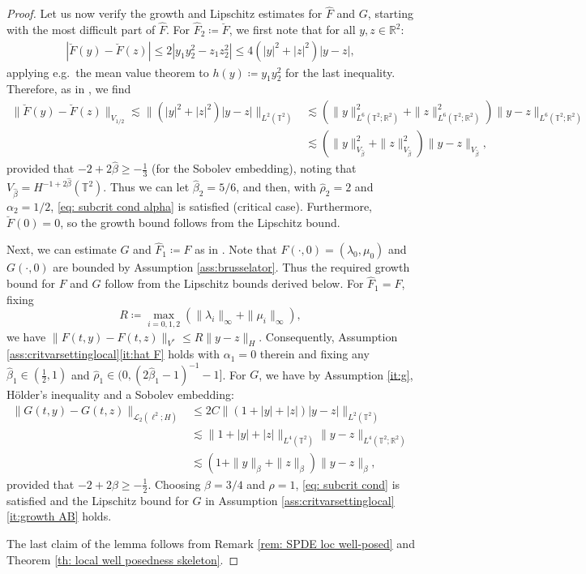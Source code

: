 \documentclass{amsart}
\newcommand{\<}{\langle}
\newcommand{\?}{\rangle}
\newcommand{\ceqq}{\coloneqq}
\newcommand{\Tor}{\mathbb{T}}
\renewcommand{\Tor}{\mathbb{T}^2}
\theoremstyle{plain}
\theoremstyle{remark}
\theoremstyle{plain}
\numberwithin{equation}{section}
\def\R{{\mathbb R}}
\begin{document}
\begin{proof}
Let us now verify the growth and Lipschitz estimates for $\hat{F}$ and $G$, starting with the most difficult part of $\hat{F}$. 
For $\hat{F}_2\ceqq \breve{F}$, we first note that for all $y,z\in\R^2$:   
\begin{align*} 
|\breve{F}(y)-\breve{F}(z)|\leq 2|y_1y_2^2-z_1z_2^2|\leq 4(|y|^2+|z|^2)|y-z|,
\end{align*}
applying e.g.\  the mean value theorem to $h(y)\ceqq y_1y_2^2$ for the last inequality.  
Therefore, as in \cite[Th.\ 8.2, p.\ 53]{BGV}, we find 
\begin{align*} 
\|\breve{F}(y)-\breve{F}(z)\|_{V_{1/2}}\lesssim\|(|y|^2+|z|^2)|y-z|\|_{L^2(\Tor)}
&\lesssim(\|y\|_{L^6(\Tor;\R^2)}^2+\|z\|_{L^6(\Tor;\R^2)}^2)\|y-z\|_{L^6(\Tor;\R^2)}\\
&\lesssim (\|y\|_{V_{\hat{\beta}}}^2+\|z\|_{V_{\hat{\beta}}}^2)\|y-z\|_{V_{\hat{\beta}}},
\end{align*}
provided that $-2+2\hat{\beta}\geq -\frac13$  (for the Sobolev embedding), noting that  $V_{\hat{\beta}}=H^{-1+2\hat{\beta}}(\Tor)$. Thus we can let $\hat{\beta}_2=5/6$, and then, with $\hat{\rho}_2=2$ and $\alpha_2=1/2$, \eqref{eq: subcrit cond alpha} is satisfied (critical case).  Furthermore, $\breve{F}(0)=0$, so the growth bound follows from the Lipschitz bound. 

Next, we can estimate $G$ and  $\hat{F}_1\ceqq F$ as in \cite[\S5.3, p.\ 993, 994]{AV22variational}. 
Note that  $F(\cdot,0)=(\lambda_0, \mu_0)$ and $G(\cdot,0)$ are bounded by Assumption \ref{ass:brusselator}. Thus the required growth bound for $F$ and $G$ follow from the Lipschitz bounds derived below.  
For $\hat{F}_1= F$, fixing 
\begin{equation}\label{eq:def R}
  {R}\ceqq \max_{i=0,1,2}(\|\lambda_i\|_\infty+\|\mu_i\|_\infty),
\end{equation} 
we have   $\|{F}(t,y)-{F}(t,z)\|_{V^*} \leq {R} \|y-z\|_{H}$.  
Consequently, Assumption \ref{ass:critvarsettinglocal}\ref{it:hat F} holds with $\alpha_1=0$ therein and fixing any $\hat{\beta}_1\in(\frac12,1)$ and $\hat{\rho}_1\in(0,({2\hat{\beta}_1-1})^{-1}-1]$.        
For $G$, we have by Assumption \ref{it:g}, H\"older's inequality and a Sobolev embedding:
\begin{align*} 
\|G(t,y)-G(t,z)\|_{\mathscr{L}_2(\ell^2;H)}&\leq 2C\|(1+|y|+|z|)|y-z|\|_{L^2(\Tor)}\\
&\lesssim\|1+|y|+|z|\|_{L^4(\Tor)}\|y-z\|_{L^4(\Tor;\R^2)}\\
&\lesssim (1+\|y\|_{\beta}+\|z\|_{\beta})\|y-z\|_{\beta},
\end{align*}
provided that $-2+2\beta\geq -\tfrac12$. Choosing $\beta=3/4$ and $\rho=1$,  \eqref{eq: subcrit cond} is satisfied and the Lipschitz bound for $G$ in Assumption \ref{ass:critvarsettinglocal}\ref{it:growth AB} holds. 

The last claim of the lemma follows from Remark \ref{rem: SPDE loc well-posed} and Theorem \ref{th: local well posedness skeleton}.
\end{proof} 
\end{document}
